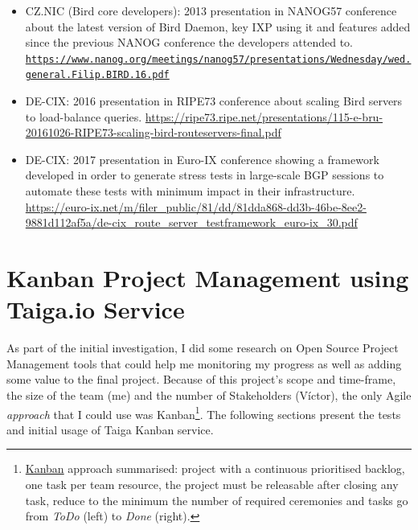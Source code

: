\begin{appendices}
\begin{itemize}
    \item CZ.NIC (Bird core developers): 2013 presentation in NANOG57 conference about the latest version of Bird Daemon, key IXP using it and features added since the previous NANOG conference the developers attended to. \href{https://www.nanog.org/meetings/nanog57/presentations/Wednesday/wed.general.Filip.BIRD.16.pdf}{\nolinkurl{https://www.nanog.org/meetings/nanog57/presentations/Wednesday/wed.general.Filip.BIRD.16.pdf}}

    \item DE-CIX: 2016 presentation in RIPE73 conference about scaling Bird servers to load-balance queries. \url{https://ripe73.ripe.net/presentations/115-e-bru-20161026-RIPE73-scaling-bird-routeservers-final.pdf}
    
    \item DE-CIX: 2017 presentation in Euro-IX conference showing a framework developed in order to generate stress tests in large-scale BGP sessions to automate these tests with minimum impact in their infrastructure. \url{https://euro-ix.net/m/filer_public/81/dd/81dda868-dd3b-46be-8ee2-9881d112af5a/de-cix_route_server_testframework_euro-ix_30.pdf}
\end{itemize}


























\chapter{Kanban Project Management using Taiga.io Service}
\label{app:sec:kanban}
As part of the initial investigation, I did some research on Open Source Project Management tools that could help me monitoring my progress as well as adding some value to the final project.
Because of this project's scope and time-frame, the size of the team (me) and the number of Stakeholders (Víctor), the only Agile \textit{approach} that I could use was Kanban\footnote{\href{http://www.scrumhub.com/kanban-fundamentals/}{Kanban} approach summarised: project with a continuous prioritised backlog, one task per team resource, the project must be releasable after closing any task, reduce to the minimum the number of required ceremonies and tasks go from \textit{ToDo} (left) to \textit{Done} (right).}. The following sections present the tests and initial usage of Taiga Kanban service.


\end{appendices}
